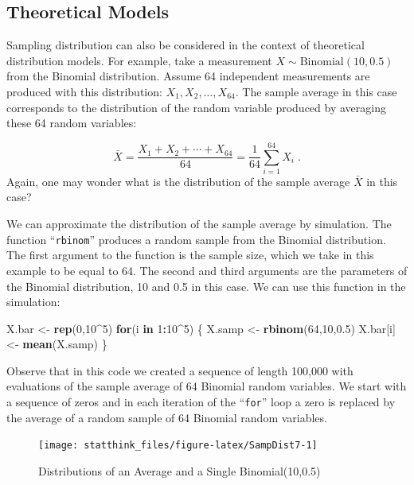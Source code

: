 \documentclass[]{krantz}
\makeatletter
\newenvironment{Shaded}{\begin{snugshade}}{\end{snugshade}}
\newcommand{\KeywordTok}[1]{\textcolor[rgb]{0.13,0.29,0.53}{\textbf{#1}}}
\newcommand{\DecValTok}[1]{\textcolor[rgb]{0.00,0.00,0.81}{#1}}
\newcommand{\FloatTok}[1]{\textcolor[rgb]{0.00,0.00,0.81}{#1}}
\newcommand{\StringTok}[1]{\textcolor[rgb]{0.31,0.60,0.02}{#1}}
\newcommand{\ControlFlowTok}[1]{\textcolor[rgb]{0.13,0.29,0.53}{\textbf{#1}}}
\newcommand{\OperatorTok}[1]{\textcolor[rgb]{0.81,0.36,0.00}{\textbf{#1}}}
\newcommand{\NormalTok}[1]{#1}
\newenvironment{kframe}{%
\medskip{}
\setlength{\fboxsep}{.8em}
 \def\at@end@of@kframe{}%
 \ifinner\ifhmode%
  \def\at@end@of@kframe{\end{minipage}}%
  \begin{minipage}{\columnwidth}%
 \fi\fi%
 \def\FrameCommand##1{\hskip\@totalleftmargin \hskip-\fboxsep
 \colorbox{shadecolor}{##1}\hskip-\fboxsep
     \hskip-\linewidth \hskip-\@totalleftmargin \hskip\columnwidth}%
 \MakeFramed {\advance\hsize-\width
   \@totalleftmargin\z@ \linewidth\hsize
   \@setminipage}}%
 {\par\unskip\endMakeFramed%
 \at@end@of@kframe}
\renewenvironment{Shaded}{\begin{kframe}}{\end{kframe}}
\theoremstyle{definition}
\theoremstyle{definition}
\theoremstyle{definition}
\theoremstyle{remark}
\makeatother
\begin{document}
\subsection{Theoretical Models}\label{subsec:theoreticalmdls}

Sampling distribution can also be considered in the context of
theoretical distribution models. For example, take a measurement
\(X \sim \mathrm{Binomial}(10,0.5)\) from the Binomial distribution.
Assume 64 independent measurements are produced with this distribution:
\(X_1, X_2, \ldots, X_{64}\). The sample average in this case
corresponds to the distribution of the random variable produced by
averaging these 64 random variables:

\[\bar X = \frac{X_1 + X_2 + \cdots + X_{64}} {64} = \frac{1}{64}\sum_{i=1}^{64} X_i\;.\]
Again, one may wonder what is the distribution of the sample average
\(\bar X\) in this case?

We can approximate the distribution of the sample average by simulation.
The function ``\texttt{rbinom}'' produces a random sample from the
Binomial distribution. The first argument to the function is the sample
size, which we take in this example to be equal to 64. The second and
third arguments are the parameters of the Binomial distribution, 10 and
0.5 in this case. We can use this function in the simulation:

\begin{Shaded}
\begin{Highlighting}[]
\NormalTok{X.bar <-}\StringTok{ }\KeywordTok{rep}\NormalTok{(}\DecValTok{0}\NormalTok{,}\DecValTok{10}\OperatorTok{^}\DecValTok{5}\NormalTok{)}
\ControlFlowTok{for}\NormalTok{(i }\ControlFlowTok{in} \DecValTok{1}\OperatorTok{:}\DecValTok{10}\OperatorTok{^}\DecValTok{5}\NormalTok{) \{}
\NormalTok{  X.samp <-}\StringTok{ }\KeywordTok{rbinom}\NormalTok{(}\DecValTok{64}\NormalTok{,}\DecValTok{10}\NormalTok{,}\FloatTok{0.5}\NormalTok{)}
\NormalTok{  X.bar[i] <-}\StringTok{ }\KeywordTok{mean}\NormalTok{(X.samp)}
\NormalTok{\}}
\end{Highlighting}
\end{Shaded}

Observe that in this code we created a sequence of length 100,000 with
evaluations of the sample average of 64 Binomial random variables. We
start with a sequence of zeros and in each iteration of the
``\texttt{for}'' loop a zero is replaced by the average of a random
sample of 64 Binomial random variables.

\begin{figure}

{\centering \texttt{[image: statthink\_files/figure-latex/SampDist7-1]} 

}

\caption{Distributions of an Average and a Single Binomial(10,0.5)}\label{fig:SampDist7}
\end{figure}
\end{document}
